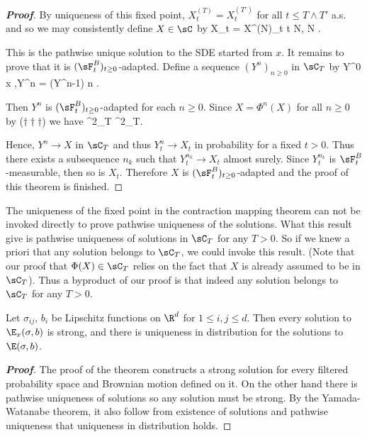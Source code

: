 \begin{proof}[\bf Proof]
By uniqueness of this fixed point, $X^{(T)}_t = X^{(T')}_t$ for all $t \leq T \land T'$ a.s. and so we may consistently define $X \in \sC$ by
\be
X_t = X^{(N)}_t \quad{}t \leq N, N \in \N.
\ee

This is the pathwise unique solution to the SDE started from $x$. It remains to prove that it is $(\sF^B_t)_{t\geq0}$-adapted. Define a sequence $(Y^n)_{n\geq0}$ in $\sC_T$ by
\be
Y^0 \equiv x ,\quad \quad Y^n = \Phi(Y^{n-1}) \quad {}n .
\ee

Then $Y^n$ is $(\sF^B_t)_{t\geq0}$-adapted for each $n \geq 0$. Since $X = \Phi^n(X)$ for all $n \geq 0$ by ($\dag\dag\dag$) we have
\be
{}^2_T \leq {} ^2_T.
\ee

Hence, $Y^n \to X$ in $\sC_T$ and thus $Y^n_t \to X_t$ in probability for a fixed $t > 0$. Thus there exists a subsequence $n_k$ such that $Y^{n_k}_t \to X_t$ almost surely. Since $Y^{n_k}_t$ is $\sF^B_t$-measurable, then so is $X_t$. Therefore $X$ is $(\sF^B_t)_{t\geq0}$-adapted and the proof of this theorem is finished.
\end{proof}


\begin{remark}
The uniqueness of the fixed point in the contraction mapping theorem can not be invoked directly to prove pathwise uniqueness of the solutions. What this result give is pathwise uniqueness of solutions in $\sC_T$ for any $T > 0$. So if we knew a priori that any solution belongs to $\sC_T$, we could invoke this result. (Note that our proof that $\Phi(X) \in \sC_T$ relies on the fact that $X$ is already assumed to be in $\sC_T$). Thus a byproduct of our proof is that indeed any solution belongs to $\sC_T$ for any $T > 0$.
\end{remark}

\begin{corollary}\label{cor:lipschitz_strong_solution}
Let $\sigma_{ij}$, $b_i$ be Lipschitz functions on $\R^d$ for $1 \leq i, j \leq d$. Then every solution to $\E_x(\sigma, b)$ is strong, and there is uniqueness in distribution for the solutions to $\E(\sigma, b)$.
\end{corollary}

\begin{proof}[\bf Proof]
The proof of the theorem constructs a strong solution for every filtered probability space and Brownian motion defined on it. On the other hand there is pathwise uniqueness of solutions so any solution must be strong. By the Yamada-Watanabe theorem, it also follow from existence of solutions and pathwise uniqueness that uniqueness in distribution holds.
\end{proof}

